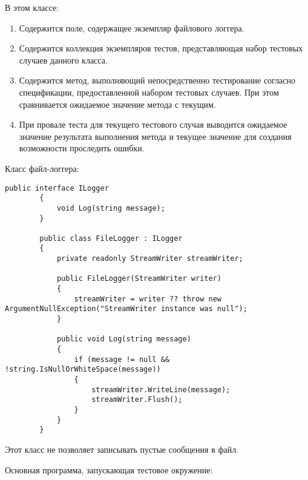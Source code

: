\documentclass[a4paper,14pt]{extarticle}
\begin{document}
    В этом классе:

    \begin{enumerate}
        \item Содержится поле, содержащее экземпляр файлового логгера.
        \item Содержится коллекция экземпляров тестов, представляющая
              набор тестовых случаев данного класса.
        \item Содержится метод, выполняющий непосредственно тестирование
              согласно спецификации, предоставленной набором тестовых случаев.
              При этом сравнивается ожидаемое значение метода с текущим.
        \item При провале теста для текущего тестового случая выводится ожидаемое
              значение результата выполнения метода и текущее значение для
              создания возможности проследить ошибки.
    \end{enumerate}

    Класс файл-логгера:

    \begin{lstlisting}[language={[Sharp]C}]
        public interface ILogger
        {
            void Log(string message);
        }
        
        public class FileLogger : ILogger
        {
            private readonly StreamWriter streamWriter;
            
            public FileLogger(StreamWriter writer)
            {
                streamWriter = writer ?? throw new ArgumentNullException("StreamWriter instance was null");
            }

            public void Log(string message)
            {
                if (message != null && !string.IsNullOrWhiteSpace(message))
                {
                    streamWriter.WriteLine(message);
                    streamWriter.Flush();
                }
            }
        }
    \end{lstlisting}

    Этот класс не позволяет записывать пустые сообщения в файл.

    Основная программа, запускающая тестовое окружение:
\end{document}
